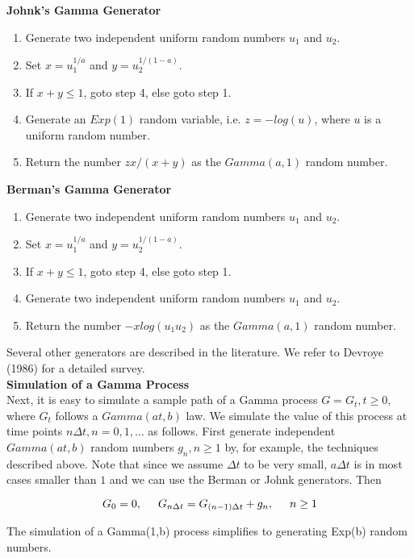 \textbf{Johnk's Gamma Generator} 
\begin{enumerate}
    \item Generate two independent uniform random numbers $u_1$ and $u_2$.
    \item Set $x=u_{1}^{1/a}$ and $y=u_{2}^{1/(1-a)}$.
    \item If $x+y\leq1$, goto step 4, else goto step 1.
    \item Generate an $Exp(1)$ random variable, i.e. $z=-log(u)$, where $u$ is a uniform random number.
    \item Return the number $zx/(x+y)$ as the $Gamma(a,1)$ random number.
\end{enumerate}

\textbf{Berman's Gamma Generator} 
\begin{enumerate}
    \item Generate two independent uniform random numbers $u_1$ and $u_2$.
    \item Set $x=u_{1}^{1/a}$ and $y=u_{2}^{1/(1-a)}$.
    \item If $x+y\leq1$, goto step 4, else goto step 1.
    \item Generate two independent uniform random numbers $u_1$ and $u_2$.
    \item Return the number $-x log(u_1u_2)$ as the $Gamma(a,1)$ random number.
\end{enumerate}

Several other generators are described in the literature. We refer to Devroye (1986) for a detailed survey.\\

\textbf{Simulation of a Gamma Process} \\
Next, it is easy to simulate a sample path of a Gamma process $G = {G_t , t\geq0}$, where $G_t$ follows a $Gamma(at, b)$ law. We simulate the value of this process at time points ${n\Delta t, n=0, 1, \ldots}$ as follows. First generate independent $Gamma(at, b)$ random numbers ${g_n, n\geq1}$ by, for example, the techniques described above. Note that since we assume $\Delta t$ to be very small, $a\Delta t$ is in most cases smaller than $1$ and we can use the Berman or Johnk generators. Then

\begin{equation}
G_0 = 0,\hspace{0.5cm} G_{n\Delta t} = G_{(n-1)\Delta t} + g_n, \hspace{0.5cm} n\geq1
\end{equation} 


The simulation of a Gamma(1,b) process simplifies to generating Exp(b) random numbers.\\